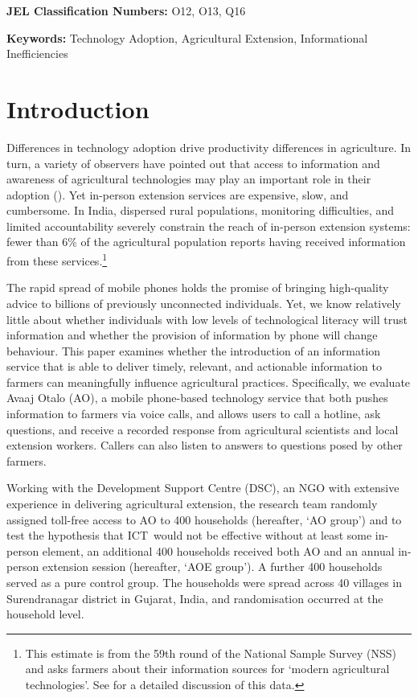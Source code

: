 \documentclass[12pt]{article}
\begin{document}
{\footnotesize \noindent \textbf{JEL Classification Numbers:} O12, O13, Q16 }

{\footnotesize \noindent \textbf{Keywords:} Technology Adoption,
Agricultural Extension, Informational Inefficiencies }

{\footnotesize \doublespacing
\linespread{1.5} }

{\normalsize \cleardoublepage
\setcounter{page}{1} }

\section{\protect\normalsize Introduction}

{\normalsize 

Differences in technology adoption drive productivity differences in agriculture. In turn, a variety of observers have pointed out that access to information and
awareness of agricultural technologies may play an important role in
their adoption (\citealp{Jack_2011}). Yet in-person extension
services are expensive, slow, and cumbersome. In India, dispersed rural
populations, monitoring difficulties, and limited accountability severely
constrain the reach of in-person extension systems: fewer than 6\% of the
agricultural population reports having received information from these
services.\footnote{%
This estimate is from the 59th round of the National Sample Survey (NSS) and
asks farmers about their information sources for `modern agricultural
technologies'. See \citealp{GBA_2010} for a detailed discussion of this data.%
} }

{\normalsize The rapid spread of mobile phones holds the promise of bringing
high-quality advice to billions of previously unconnected individuals. Yet,
we know relatively little about whether individuals with low levels of
technological literacy will trust information and whether the provision of
information by phone will change behaviour. This paper examines whether the
introduction of an information service that is able to deliver timely,
relevant, and actionable information to farmers can meaningfully
influence agricultural practices. Specifically, we evaluate Avaaj Otalo
(AO), a mobile phone-based technology service that both pushes information to
farmers via voice calls, and allows users to call a hotline, ask questions,
and receive a recorded response from agricultural scientists and local
extension workers. Callers can also listen to answers to questions posed by
other farmers. }

{\normalsize Working with the Development Support Centre (DSC), an NGO with
extensive experience in delivering agricultural extension, the research team
randomly assigned toll-free access to AO to 400 households (hereafter, `AO
group') and to test the hypothesis that ICT\ would not be effective without
at least some in-person element, an additional 400 households received both
AO and an annual in-person extension session (hereafter, `AOE group'). A
further 400 households served as a pure control group. The households were spread across 40 villages in Surendranagar district in Gujarat, India, and randomisation occurred at the household level.}
\end{document}
